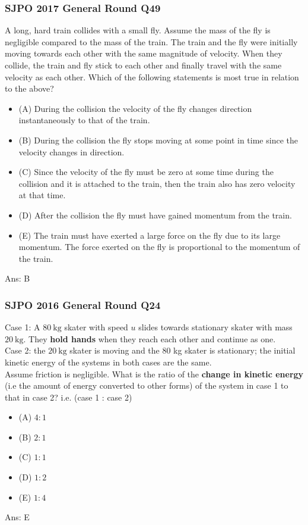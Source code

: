 \documentclass{article}
\begin{document}
\subsubsection{SJPO 2017 General Round Q49}
A long, hard train collides with a small fly. Assume the mass of the fly is negligible compared to the mass of the train. The train and the fly were initially moving towards each other with the same magnitude of velocity. When they collide, the train and fly stick to each other and finally travel with the same velocity as each other. Which of the following statements is most true in relation to the above?
\begin{itemize}
\item[] (A) During the collision the velocity of the fly changes direction instantaneously to that of the train.
\item[] (B) During the collision the fly stops moving at some point in time since the velocity changes in direction.
\item[] (C) Since the velocity of the fly must be zero at some time during the collision and it is attached to the train, then the train also has zero velocity at that time.
\item[] (D) After the collision the fly must have gained momentum from the train.
\item[] (E) The train must have exerted a large force on the fly due to its large momentum. The force exerted on the fly is proportional to the momentum of the train.
\end{itemize}
Ans: \ifpaper B \fi
\subsubsection{SJPO 2016 General Round Q24}
Case 1: A $80 \mathrm{~kg}$ skater with speed $u$ slides towards stationary skater with mass $20 \mathrm{~kg}$. They \textbf{hold hands} when they reach each other and continue as one. \\[10pt]
Case 2: the $20 \mathrm{~kg}$ skater is moving and the 80 kg skater is stationary; the initial kinetic energy of the systems in both cases are the same. \\[10pt]
Assume friction is negligible. What is the ratio of the \textbf{change in kinetic energy} (i.e the amount of energy converted to other forms) of the system in case 1 to that in case 2? i.e. (case 1 : case 2)
\begin{itemize}
\item[] (A) $4: 1$
\item[] (B) $2: 1$
\item[] (C) $1: 1$
\item[] (D) $1: 2$
\item[] (E) $1: 4$
\end{itemize}
Ans: \ifpaper E \fi
\end{document}
